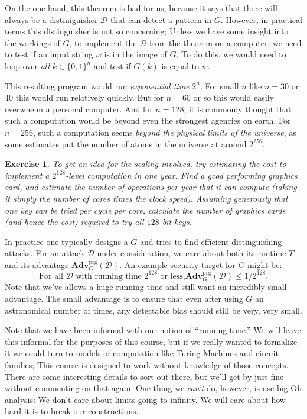 \documentclass[11pt]{article}
\newtheorem{exercise}{Exercise}
\newcommand{\calD}{\mathcal{D}}
\newcommand{\Adv}{\mathbf{Adv}}
\newcommand{\AdvPRG}[2]{\Adv^{\mathrm{prg}}_{#1}({#2})}
\newcommand{\bits}{\{0,1\}}
\begin{document}
On the one hand, this theorem is bad for us, because it says that there will
always be a distiniguisher $\calD$ that can detect a pattern in $G$.  However,
in practical terms this distinguisher is not so concerning; Unless we have some
insight into the workings of $G$, to implement the $\calD$ from the theorem on
a computer, we need to test if an input string $w$ is in the image of $G$. To
do this, we would need to loop over \emph{all} $k\in\bits^n$ and test if $G(k)$
is equal to $w$. 

This resulting program would run \emph{exponential time} $2^n$.  For small $n$
like $n=30$ or $40$ this would run relatively quickly.  But for $n=60$ or so
this would easily overwhelm a personal computer. And for $n=128$, it is
commonly thought that such a computation would be beyond even the strongest
agencies on earth.  For $n=256$, such a computation seems \emph{beyond the
physical limits of the universe}, as some estimates put the number of atoms in
the universe at around $2^{256}$.

\begin{exercise}
    To get an idea for the scaling involved, try estimating the cost to
    implement a $2^{128}$-level computation in one year. Find a 
    good performing graphics card, and estimate the number of operations
    per year that it can compute (taking it simply the number of cores
    times the clock speed). Assuming generously that one key can be tried
    per cycle per core, calculate the number of graphics cards (and hence
    the cost) required to try all $128$-bit keys.
\end{exercise}

In practice one typically designs a $G$ and tries to find efficient
distinguishing attacks. For an attack $\calD$ under consideration, we
care about both its runtime $T$ and its advantage $\AdvPRG{G}{\calD}$.
An example security target for $G$ might be:
\[
    \text{For all $\calD$ with running time $2^{128}$ or less,
$\AdvPRG{G}{\calD}\leq 1/2^{128}$.}
\]
Note that we've allows a huge running time and still want an incredibly small
advantage. The small advantage is to ensure that even after using $G$ an
astronomical number of times, any detectable bias should still be very, very
small.

Note that we have been informal with our notion of ``running time.'' We will
leave this informal for the purposes of this course, but if we really wanted to
formalize it we could turn to models of computation like Turing Machines and
circuit families; This course is designed to work without knowledge of those
concepts.  There are some interesting details to sort out there, but we'll get
by just fine without commenting on that again.  One thing we \emph{can't} do,
however, is use big-Oh analysis: We don't care about limits going to infinity.
We will care about how hard it is to break our constructions.
\end{document}
